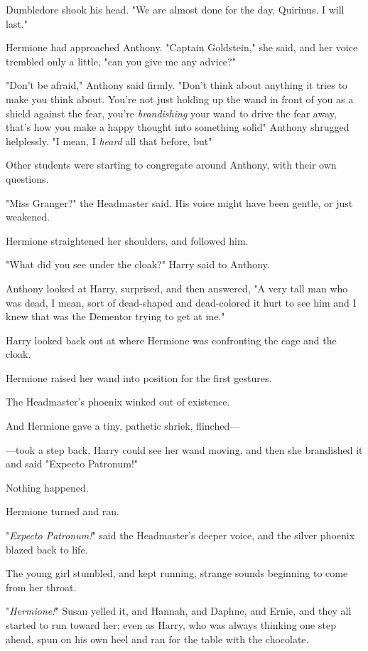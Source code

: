 Dumbledore shook his head. "We are almost done for the day, Quirinus. I will
last."

Hermione had approached Anthony. "Captain Goldstein," she said, and her voice
trembled only a little, "can you give me any advice?"

"Don't be afraid," Anthony said firmly. "Don't think about anything it tries to
make you think about. You're not just holding up the wand in front of you as a
shield against the fear, you're \emph{brandishing} your wand to drive the fear
away, that's how you make a happy thought into something solid{\el}" Anthony
shrugged helplessly. "I mean, I \emph{heard} all that before, but{\el}"

Other students were starting to congregate around Anthony, with their own
questions.

"Miss Granger?" the Headmaster said. His voice might have been gentle, or just
weakened.

Hermione straightened her shoulders, and followed him.

"What did you see under the cloak?" Harry said to Anthony.

Anthony looked at Harry, surprised, and then answered, "A very tall man who was
dead, I mean, sort of dead-shaped and dead-colored{\el} it hurt to see him
and I knew that was the Dementor trying to get at me."

Harry looked back out at where Hermione was confronting the cage and the cloak.

Hermione raised her wand into position for the first gestures.

The Headmaster's phoenix winked out of existence.

And Hermione gave a tiny, pathetic shriek, flinched—

—took a step back, Harry could see her wand moving, and then she brandished
it and said "Expecto Patronum!"

Nothing happened.

Hermione turned and ran.

"\emph{Expecto Patronum!}" said the Headmaster's deeper voice, and the silver
phoenix blazed back to life.

The young girl stumbled, and kept running, strange sounds beginning to come
from her throat.

"\emph{Hermione!}" Susan yelled it, and Hannah, and Daphne, and Ernie, and they
all started to run toward her; even as Harry, who was always thinking one step
ahead, spun on his own heel and ran for the table with the chocolate.

